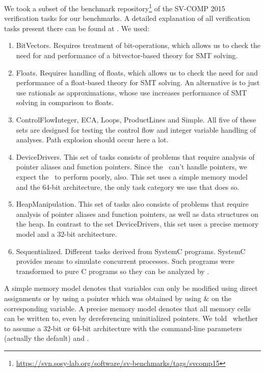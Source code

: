 We took a subset of the benchmark repository\footnote{\url{https://svn.sosy-lab.org/software/sv-benchmarks/tags/svcomp15}}
of the SV-COMP 2015 verification tasks for our benchmarks.
A detailed explanation of all verification tasks present there can be found at \cite{SV15Benchmark}.
We used:
\begin{enumerate}
\item BitVectors. Requires treatment of bit-operations, which allows us to check the need for and performance of a bitvector-based theory for SMT solving.

\item Floats. Requires handling of floats, which allows us to check the need for and performance of a float-based theory for SMT solving. An alternative is to just use rationals as approximations, whose use increases performance of SMT solving in comparison to floats.

\item ControlFlowInteger, ECA, Loops, ProductLines and Simple.
All five of these sets are designed for testing the control flow and integer variable handling of analyses.
Path explosion should occur here a lot.

\item DeviceDrivers.
This set of tasks consists of problems that require analysis of pointer aliases and function pointers.
Since the \ can't handle pointers, we expect the \symbolicExecutionCPA\ to perform poorly, also.
This set uses a simple memory model and the 64-bit architecture, the only task category we use that does so.

\item HeapManipulation. 
This set of tasks also consists of problems that require analysis of pointer aliases and function pointers, as well as data structures on the heap.
In contrast to the set DeviceDrivers, this set uses a precise memory model and a 32-bit architecture.

\item Sequentialized.
Different tasks derived from SystemC programs.
SystemC provides means to simulate concurrent processes.
Such programs were transformed to pure C programs so they can be analyzed by \cpaChecker.

\end{enumerate}
A simple memory model denotes that variables can only be modified using direct assignments or by using a pointer which was obtained by using $\&$ on the corresponding variable.
A precise memory model denotes that all memory cells can be written to, even by dereferencing uninitialized pointers.
We told \cpaChecker\ whether to assume a 32-bit or 64-bit architecture with the command-line parameters  (actually the default) and .

